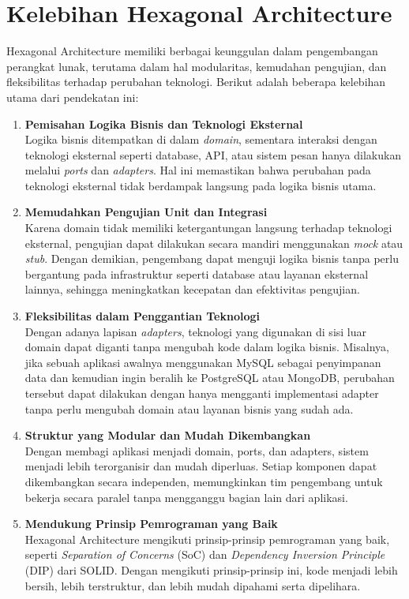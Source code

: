 \section{Kelebihan Hexagonal Architecture}

Hexagonal Architecture memiliki berbagai keunggulan dalam pengembangan perangkat lunak, terutama dalam hal modularitas, kemudahan pengujian, dan fleksibilitas terhadap perubahan teknologi. Berikut adalah beberapa kelebihan utama dari pendekatan ini:

\begin{enumerate}
	\item \textbf{Pemisahan Logika Bisnis dan Teknologi Eksternal} \\
	Logika bisnis ditempatkan di dalam \textit{domain}, sementara interaksi dengan teknologi eksternal seperti database, API, atau sistem pesan hanya dilakukan melalui \textit{ports} dan \textit{adapters}. Hal ini memastikan bahwa perubahan pada teknologi eksternal tidak berdampak langsung pada logika bisnis utama.
	
	\item \textbf{Memudahkan Pengujian Unit dan Integrasi} \\
	Karena domain tidak memiliki ketergantungan langsung terhadap teknologi eksternal, pengujian dapat dilakukan secara mandiri menggunakan \textit{mock} atau \textit{stub}. Dengan demikian, pengembang dapat menguji logika bisnis tanpa perlu bergantung pada infrastruktur seperti database atau layanan eksternal lainnya, sehingga meningkatkan kecepatan dan efektivitas pengujian.
	
	\item \textbf{Fleksibilitas dalam Penggantian Teknologi} \\
	Dengan adanya lapisan \textit{adapters}, teknologi yang digunakan di sisi luar domain dapat diganti tanpa mengubah kode dalam logika bisnis. Misalnya, jika sebuah aplikasi awalnya menggunakan MySQL sebagai penyimpanan data dan kemudian ingin beralih ke PostgreSQL atau MongoDB, perubahan tersebut dapat dilakukan dengan hanya mengganti implementasi adapter tanpa perlu mengubah domain atau layanan bisnis yang sudah ada.
	
	\item \textbf{Struktur yang Modular dan Mudah Dikembangkan} \\
	Dengan membagi aplikasi menjadi domain, ports, dan adapters, sistem menjadi lebih terorganisir dan mudah diperluas. Setiap komponen dapat dikembangkan secara independen, memungkinkan tim pengembang untuk bekerja secara paralel tanpa mengganggu bagian lain dari aplikasi.
	
	\item \textbf{Mendukung Prinsip Pemrograman yang Baik} \\
	Hexagonal Architecture mengikuti prinsip-prinsip pemrograman yang baik, seperti \textit{Separation of Concerns} (SoC) dan \textit{Dependency Inversion Principle} (DIP) dari SOLID. Dengan mengikuti prinsip-prinsip ini, kode menjadi lebih bersih, lebih terstruktur, dan lebih mudah dipahami serta dipelihara.
\end{enumerate}

